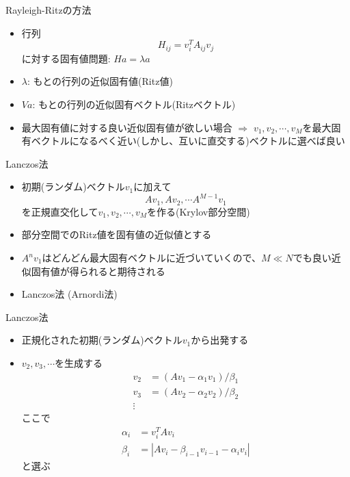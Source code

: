\begin{frame}[t,fragile]{Rayleigh-Ritzの方法}
  \begin{itemize}
    \setlength{\itemsep}{1em}
  \item 行列
    \[
    H_{ij} = v_i^T A_{ij} v_j
    \]
    に対する固有値問題: $H a = \lambda a$
  \item $\lambda$: もとの行列の近似固有値(Ritz値)
  \item $Va$: もとの行列の近似固有ベクトル(Ritzベクトル)
  \item 最大固有値に対する良い近似固有値が欲しい場合 $\Rightarrow$ $v_1,v_2,\cdots,v_M$を最大固有ベクトルになるべく近い(しかし、互いに直交する)ベクトルに選べば良い
  \end{itemize}
\end{frame}

\begin{frame}[t,fragile]{Lanczos法}
  \begin{itemize}
    \setlength{\itemsep}{1em}
  \item 初期(ランダム)ベクトル$v_1$に加えて
    \[
    Av_1, Av_2, \cdots A^{M-1}v_1
    \]
    を正規直交化して$v_1,v_2,\cdots,v_M$を作る(Krylov部分空間)
  \item 部分空間でのRitz値を固有値の近似値とする
  \item $A^nv_1$はどんどん最大固有ベクトルに近づいていくので、$M \ll N$でも良い近似固有値が得られると期待される
  \item Lanczos法 (Arnordi法)
  \end{itemize}
\end{frame}

\begin{frame}[t,fragile]{Lanczos法}
  \begin{itemize}
  \item 正規化された初期(ランダム)ベクトル$v_1$から出発する %
  \item $v_2,v_3,\cdots$を生成する
    \begin{align*}
      v_2 &= (Av_1 - \alpha_1 v_1)/\beta_1 \\
      v_3 &= (Av_2 - \alpha_2 v_2)/\beta_2 \\
      \vdots
    \end{align*}
    ここで
    \begin{align*}
      \alpha_i &= v_i^T A v_i \\
      \beta_i &= | A v_i - \beta_{i-1} v_{i-1} - \alpha_i v_i |
    \end{align*}
    と選ぶ
  \end{itemize}
\end{frame}

